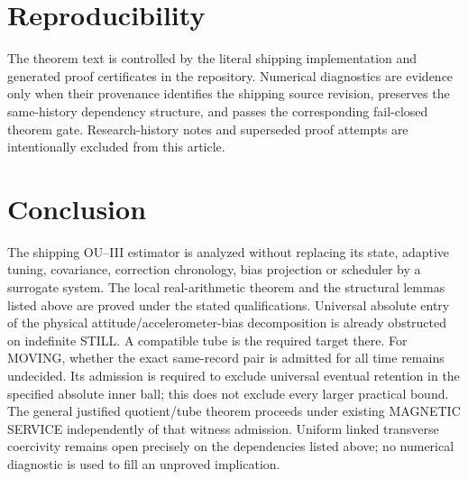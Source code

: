 \documentclass[journal]{IEEEtran}
\begin{document}
\section{Reproducibility}
The theorem text is controlled by the literal shipping implementation and generated proof certificates in the repository. Numerical diagnostics are evidence only when their provenance identifies the shipping source revision, preserves the same-history dependency structure, and passes the corresponding fail-closed theorem gate. Research-history notes and superseded proof attempts are intentionally excluded from this article.

\section{Conclusion}
The shipping OU--III estimator is analyzed without replacing its state,
adaptive tuning, covariance, correction chronology, bias projection or
scheduler by a surrogate system.  The local real-arithmetic theorem and the
structural lemmas listed above are proved under the stated qualifications.
Universal absolute entry of the physical attitude/accelerometer-bias
decomposition is already obstructed on indefinite STILL. A compatible tube
is the required target there. For MOVING, whether the exact same-record pair
is admitted for all time remains undecided. Its admission is required to
exclude universal eventual retention in the specified absolute inner ball;
this does not exclude every larger practical bound. The general justified
quotient/tube theorem proceeds under existing MAGNETIC SERVICE independently
of that witness admission. Uniform linked transverse coercivity remains open
precisely on the dependencies listed above; no numerical diagnostic is used
to fill an unproved implication.

\balance


\end{document}
